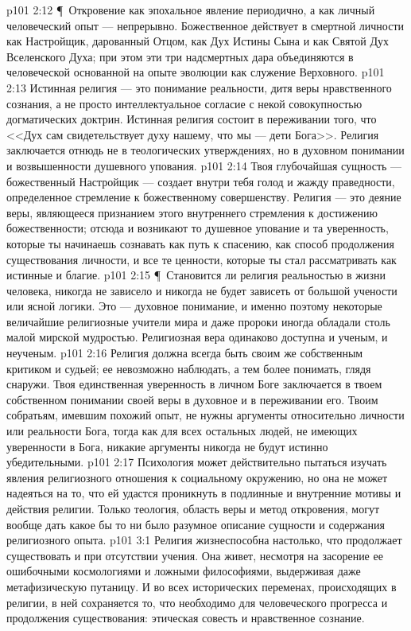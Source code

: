 \vs p101 2:12 \P\ Откровение как эпохальное явление периодично, а как личный человеческий опыт --- непрерывно. Божественное действует в смертной личности как Настройщик, дарованный Отцом, как Дух Истины Сына и как Святой Дух Вселенского Духа; при этом эти три надсмертных дара объединяются в человеческой основанной на опыте эволюции как служение Верховного.
\vs p101 2:13 Истинная религия --- это понимание реальности, дитя веры нравственного сознания, а не просто интеллектуальное согласие с некой совокупностью догматических доктрин. Истинная религия состоит в переживании того, что <<Дух сам свидетельствует духу нашему, что мы --- дети Бога>>. Религия заключается отнюдь не в теологических утверждениях, но в духовном понимании и возвышенности душевного упования.
\vs p101 2:14 Твоя глубочайшая сущность --- божественный Настройщик --- создает внутри тебя голод и жажду праведности, определенное стремление к божественному совершенству. Религия --- это деяние веры, являющееся признанием этого внутреннего стремления к достижению божественности; отсюда и возникают то душевное упование и та уверенность, которые ты начинаешь сознавать как путь к спасению, как способ продолжения существования личности, и все те ценности, которые ты стал рассматривать как истинные и благие.
\vs p101 2:15 \P\ Становится ли религия реальностью в жизни человека, никогда не зависело и никогда не будет зависеть от большой учености или ясной логики. Это --- духовное понимание, и именно поэтому некоторые величайшие религиозные учители мира и даже пророки иногда обладали столь малой мирской мудростью. Религиозная вера одинаково доступна и ученым, и неученым.
\vs p101 2:16 Религия должна всегда быть своим же собственным критиком и судьей; ее невозможно наблюдать, а тем более понимать, глядя снаружи. Твоя единственная уверенность в личном Боге заключается в твоем собственном понимании своей веры в духовное и в переживании его. Твоим собратьям, имевшим похожий опыт, не нужны аргументы относительно личности или реальности Бога, тогда как для всех остальных людей, не имеющих уверенности в Бога, никакие аргументы никогда не будут истинно убедительными.
\vs p101 2:17 Психология может действительно пытаться изучать явления религиозного отношения к социальному окружению, но она не может надеяться на то, что ей удастся проникнуть в подлинные и внутренние мотивы и действия религии. Только теология, область веры и метод откровения, могут вообще дать какое бы то ни было разумное описание сущности и содержания религиозного опыта.
\vs p101 3:1 Религия жизнеспособна настолько, что продолжает существовать и при отсутствии учения. Она живет, несмотря на засорение ее ошибочными космологиями и ложными философиями, выдерживая даже метафизическую путаницу. И во всех исторических переменах, происходящих в религии, в ней сохраняется то, что необходимо для человеческого прогресса и продолжения существования: этическая совесть и нравственное сознание.
